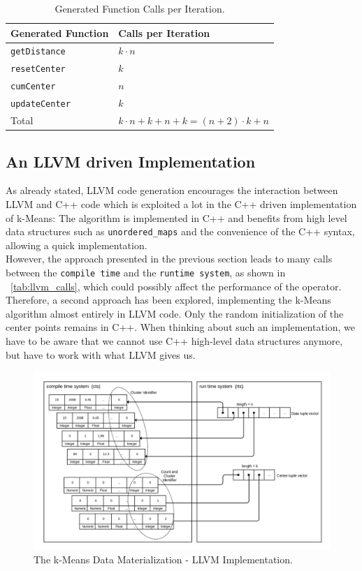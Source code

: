 \begin{table}[htsb]
  \caption[LLVM number of calls]{Generated Function Calls per Iteration.}\label{tab:llvm_calls}
  \centering
  \begin{tabular}{l l}
    \toprule
      Generated Function & Calls per Iteration \\
    \midrule
      \texttt{getDistance} & $k \cdot n$ \\
      \texttt{resetCenter} & $k$ \\
      \texttt{cumCenter} & $n$ \\
      \texttt{updateCenter} & $k$ \\
    \bottomrule
      Total & $k \cdot n + k + n + k = (n + 2) \cdot k + n$ \\
  \end{tabular}
\end{table}


\subsection{An LLVM driven Implementation}

As already stated, LLVM code generation encourages the interaction between LLVM and C++ code which is exploited a lot in the C++ driven implementation of k-Means: The algorithm is implemented in C++ and benefits from high level data structures such as \texttt{unordered\_maps} and the convenience of the C++ syntax, allowing a quick implementation. 
\\
However, the approach presented in the previous section leads to many calls between the \texttt{compile time} and the \texttt{runtime system}, as shown in ~\autoref{tab:llvm_calls}, which could possibly affect the performance of the operator. Therefore, a second approach has been explored, implementing the k-Means algorithm almost entirely in LLVM code. Only the random initialization of the center points remains in C++. When thinking about such an implementation, we have to be aware that we cannot use C++ high-level data structures anymore, but have to work with what LLVM gives us.


\begin{figure}[htsb]
  \centerline{
    \includegraphics[scale=0.4]{figures/mat4_font}
  }
  \caption[The k-Means Data Materialization - LLVM Implementation]{The k-Means Data Materialization - LLVM Implementation.}
  \label{fig:mat4}
\end{figure}

